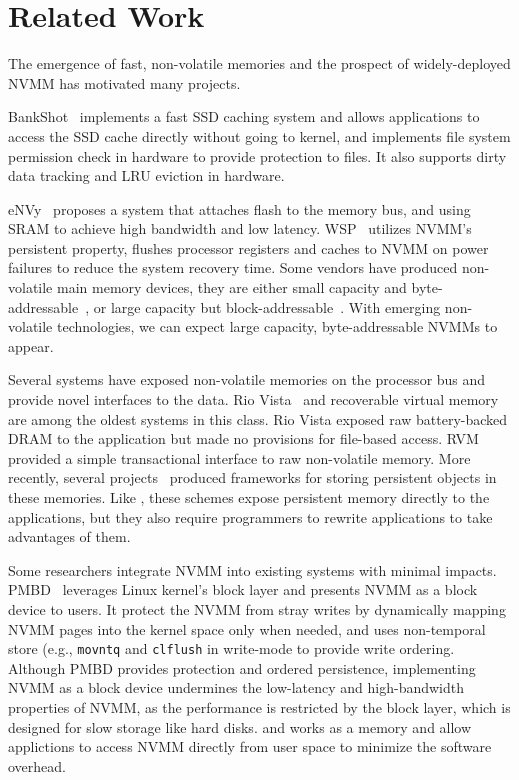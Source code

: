 \section{Related Work} 
\label{sec:related}

The emergence of fast, non-volatile memories and the prospect of
widely-deployed NVMM has motivated many projects.

BankShot~\cite{BankShot} implements a fast SSD caching system
and allows applications to access the SSD cache directly without going to
kernel, and implements file system permission check in hardware to provide
protection to files. It also supports dirty data tracking and LRU eviction
in hardware.

eNVy~\cite{eNVy} proposes a system that attaches flash to the memory
bus, and using SRAM to achieve high bandwidth and low latency.
WSP~\cite{WSP} utilizes NVMM's persistent property, flushes processor registers
and caches to NVMM on power failures to reduce the system recovery time.
Some vendors have produced non-volatile main memory devices, they are
either small capacity and byte-addressable~\cite{micron-nvdimm},
or large capacity but block-addressable~\cite{smart-system}.
With emerging non-volatile technologies, we can expect
large capacity, byte-addressable NVMMs to appear.

Several systems have exposed non-volatile memories on the processor bus
and provide novel interfaces to the data. Rio Vista~\cite{riovista} and
recoverable virtual memory~\cite{RVM} are among the oldest systems in this
class. Rio Vista exposed raw battery-backed DRAM to the application but made
no provisions for file-based access. RVM provided a simple transactional
interface to raw non-volatile memory.  More recently, several projects~\cite{nvtm,
mnemosyne,hpnvdata} produced frameworks for storing persistent objects
in these memories. Like \Chell{}, these schemes expose persistent memory directly
to the applications, but they also require programmers to rewrite applications
to take advantages of them.

Some researchers integrate NVMM into existing systems with minimal impacts.
PMBD~\cite{PMBD} leverages Linux kernel's block layer and presents NVMM as
a block device to users. It protect the NVMM from stray writes by dynamically
mapping NVMM pages into the kernel space only when needed, and uses non-temporal
store (e.g., \texttt{movntq} and \texttt{clflush} in write-mode to provide write
ordering.  Although PMBD provides protection and ordered persistence,
implementing NVMM as a block device undermines the low-latency and
high-bandwidth properties of NVMM, as the performance is restricted by the
block layer, which is designed for slow storage like hard disks. \DAChell{}
and \CChell{} works as a memory and allow applictions to access NVMM directly
from user space to minimize the software overhead.

